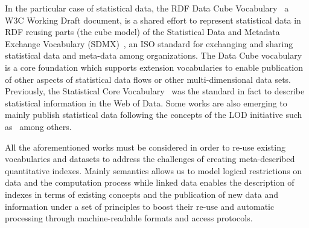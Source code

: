 
In the particular case of statistical data, the RDF Data Cube Vocabulary~\cite{rdf-data-cube}
a W3C Working Draft document, is a shared effort to represent statistical data in RDF reusing parts (the cube model) 
of the Statistical Data and Metadata Exchange Vocabulary (SDMX)~\cite{sdmx}, an ISO standard 
for exchanging and sharing statistical data and meta-data among organizations. The Data Cube vocabulary is a core 
foundation which supports extension vocabularies to enable publication of other aspects of statistical data flows or 
other multi-dimensional data sets. Previously, the Statistical Core Vocabulary~\cite{scovo} was the standard in fact to describe statistical information in the Web of Data.
Some works are also emerging to mainly publish statistical data following the concepts of the LOD initiative 
such as~\cite{DBLP:conf/semweb/ZapilkoM11,DBLP:journals/ijsc/SalasMBCMA12,DDI2013,DBLP:conf/dgo/FernandezMG11,webindexlod} 
among others.

All the aforementioned works must be considered in order to re-use existing vocabularies and datasets to address 
the challenges of creating meta-described quantitative indexes. Mainly semantics allows us to model logical restrictions 
on data and the computation process while linked data enables the description of indexes in terms of existing concepts and 
the publication of new data and information under a set of principles to boost their re-use and automatic 
processing through machine-readable formats and access protocols.


